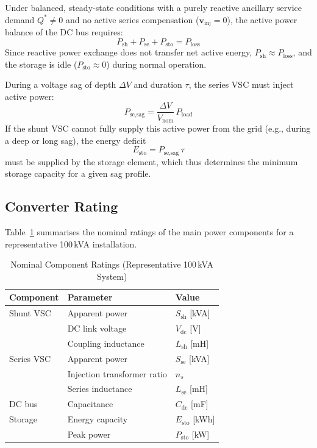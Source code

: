 \documentclass[conference]{IEEEtran}
\begin{document}
Under balanced, steady-state conditions with a purely reactive
ancillary service demand $Q^* \neq 0$ and no active series
compensation ($\bm{v}_\text{inj} = 0$), the active power
balance of the DC bus requires:
\begin{equation}
  P_\text{sh} + P_\text{se} + P_\text{sto} = P_\text{loss}
  \label{eq:power_balance}
\end{equation}
Since reactive power exchange does not transfer net active energy,
$P_\text{sh} \approx P_\text{loss}$, and the storage is idle
($P_\text{sto} \approx 0$) during normal operation.

During a voltage sag of depth $\Delta V$ and duration $\tau$,
the series VSC must inject active power:
\begin{equation}
  P_\text{se,sag} = \frac{\Delta V}{V_\text{nom}}\,P_\text{load}
  \label{eq:sag_power}
\end{equation}
If the shunt VSC cannot fully supply this active power from the grid
(e.g., during a deep or long sag), the energy deficit
\begin{equation}
  E_\text{sto} = P_\text{se,sag}\,\tau
  \label{eq:storage_energy}
\end{equation}
must be supplied by the storage element, which thus determines
the minimum storage capacity for a given sag profile.

\subsection{Converter Rating}

Table~\ref{tab:ratings} summarises the nominal ratings of the main
power components for a representative 100\,kVA installation.

\begin{table}[htbp]
  \centering
  \caption{Nominal Component Ratings (Representative 100\,kVA System)}
  \label{tab:ratings}
  \begin{tabular}{@{}lll@{}}
    \toprule
    \textbf{Component} & \textbf{Parameter} & \textbf{Value} \\
    \midrule
    Shunt VSC           & Apparent power     & $S_\text{sh}$ [kVA] \\
                        & DC link voltage    & $V_\text{dc}$ [V] \\
                        & Coupling inductance & $L_\text{sh}$ [mH] \\
    \midrule
    Series VSC          & Apparent power     & $S_\text{se}$ [kVA] \\
                        & Injection transformer ratio & $n_s$ \\
                        & Series inductance  & $L_\text{se}$ [mH] \\
    \midrule
    DC bus              & Capacitance        & $C_\text{dc}$ [mF] \\
    \midrule
    Storage             & Energy capacity    & $E_\text{sto}$ [kWh] \\
                        & Peak power         & $P_\text{sto}$ [kW] \\
    \bottomrule
  \end{tabular}
\end{table}
\end{document}
